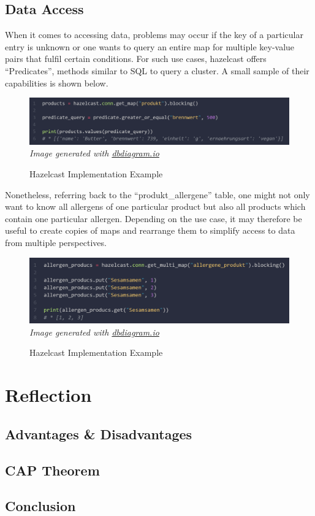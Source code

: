 \subsection{Data Access} \label{subsec:dataAccessHazelcast}

When it comes to accessing data, problems may occur if the key of a particular entry is unknown or one wants 
to query an entire map for multiple key-value pairs that fulfil certain conditions. For such use cases, 
hazelcast offers \enquote{Predicates}, methods similar to SQL to query a cluster. \textcite{Hazelcast.Predicates} 
A small sample of their capabilities is shown below. 

\begin{figure}[H]
    \caption{Hazelcast Implementation Example} \label{fig:hazelcast.predicates}
    \includegraphics[width=1\textwidth]{images/hazelcast.predicates.png}
    \small\textit{Image generated with \href{https://dbdiagram.io/}{dbdiagram.io}}
\end{figure}

Nonetheless, referring back to the \enquote{produkt\_allergene} table, one might not only want to know all 
allergens of one particular product but also all products which contain one particular allergen. 
Depending on the use case, it may therefore be useful to create copies of maps and rearrange them 
to simplify access to data from multiple perspectives. 

\begin{figure}[H]
    \caption{Hazelcast Implementation Example} \label{fig:hazelcast.product_allergens.2.multimap}
    \includegraphics[width=1\textwidth]{images/hazelcast.product_allergens.multimap.2.png}
    \small\textit{Image generated with \href{https://dbdiagram.io/}{dbdiagram.io}}
\end{figure}




\section{Reflection} \label{sec:reflectionHazelcast}
\subsection{Advantages \& Disadvantages} \label{subsec:advantagesDisadvantagesHazelcast}
\subsection{CAP Theorem} \label{subsec:capTheoremHazelcast}
\subsection{Conclusion} \label{subsec:conclusionHazelcast}

